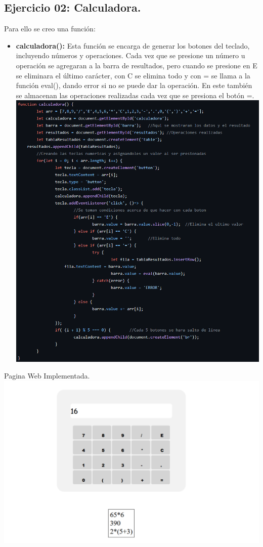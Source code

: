 \documentclass{article}
\begin{document}
\subsection*{Ejercicio 02: Calculadora.}
Para ello se creo una función:
\begin{itemize}
\item \textbf{calculadora(): } Esta función se encarga de generar los botones del teclado, incluyendo números y operaciones. Cada vez que se presione un número u operación se agregaran a la barra de resultados, pero cuando se presione en E se eliminara el último carácter, con C se elimina todo y con = se llama a la función eval(), dando error si no se puede dar la operación. En este también se almacenan las operaciones realizadas cada vez que se presiona el botón =.\\



\includegraphics[width=\textwidth]{img/5.png}
\end{itemize}
Pagina Web Implementada.\\



\includegraphics[width=\textwidth]{img/6.png}
\end{document}
